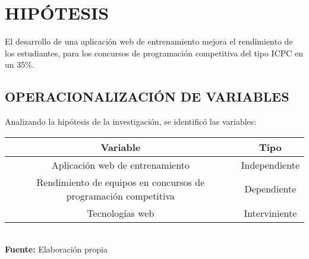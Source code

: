 \section{HIPÓTESIS}
El desarrollo de una aplicación web de entrenamiento mejora el rendimiento de los estudiantes, para los concursos de programación competitiva del tipo ICPC en un 35\%.

\subsection{OPERACIONALIZACIÓN DE VARIABLES}
Analizando la hipótesis de la investigación, se identificó las variables:

\begin{center}
    \begin{tabular}{|c|c|}
        \hline
        \textbf{Variable} & \textbf{Tipo} \\
        \hline
        Aplicación web de entrenamiento & Independiente \\
        \hline
        Rendimiento de equipos en concursos de programación competitiva & Dependiente \\
        \hline
        Tecnologías web & Interviniente\\
        \hline
    \end{tabular}\\
    \vspace{2mm}
    \textbf{Fuente:} Elaboración propia
\end{center}